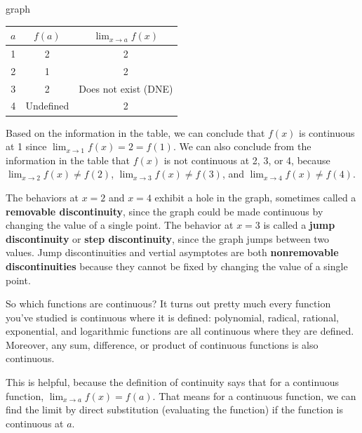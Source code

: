graph 
\begin{table}[ht!]
\begin{centering}
\begin{tabular}{ccc}
\toprule
$a$	& $f(a)$ &	$\displaystyle\lim_{x\to a}f(x)$ \\		
\midrule
1 &	2 & 2	\\
2 & 1 &	2\\
3 & 2 &	Does not exist (DNE)	\\
4 & Undefined &	2\\
\bottomrule
\end{tabular}
\end{centering}
\end{table}
	
Based on the information in the table, we can conclude that $f(x)$ is continuous at 1 since $\displaystyle\lim_{x\to 1}f(x)=2=f(1)$. We can also conclude from the information in the table that $f(x)$ is not continuous at 2, 3, or 4, because $\displaystyle\lim_{x\to 2}f(x)\neq f(2)$, $\displaystyle\lim_{x\to 3} f(x)\neq f(3)$, and $\displaystyle\lim_{x\to 4} f(x)\neq f(4)$.

The behaviors at $x=2$ and $x=4$ exhibit a hole in the graph, sometimes called a {\bf removable discontinuity}, since the graph could be made continuous by changing the value of a single point. The behavior at $x=3$ is called a {\bf jump discontinuity} or {\bf step discontinuity}, since the graph jumps between two values. Jump discontinuities and vertial asymptotes are both {\bf nonremovable discontinuities} because they cannot be fixed by changing the value of a single point.

So which functions are continuous? It turns out pretty much every function you've studied is continuous where it is defined: polynomial, radical, rational, exponential, and logarithmic functions are all continuous where they are defined. Moreover, any sum, difference, or product of continuous functions is also continuous.

This is helpful, because the definition of continuity says that for a continuous function, $\displaystyle\lim_{x\to a}f(x)=f(a)$. That means for a continuous function, we can find the limit by direct substitution (evaluating the function) if the function is continuous at $a$.

